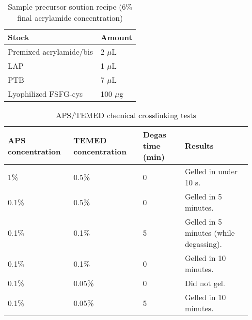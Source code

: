 \begin{table}[b!]
\centering
  \caption[Acrylamide hydrogel recipes.]{Sample precursor soution recipe (6\% final acrylamide concentration)}
    \label{table:acrylamide-recipe}
    \begin{tabular}{p{5cm}p{5cm}}
      Stock & Amount \\
\hline
Premixed acrylamide/bis & 2 $\mu$L \\

LAP & 1 $\mu$L \\

PTB & 7 $\mu$L \\

Lyophilized FSFG-cys & 100 $\mu$g \\
\hline
    \end{tabular}
\end{table}

\begin{table}[b!]
\centering
  \caption[APS/TEMED crosslinking times.]{APS/TEMED chemical crosslinking tests}
    \label{table:APS}
    \begin{tabular}{p{3.5cm}p{4cm}p{2cm}p{5cm}}
      APS concentration & TEMED concentration & Degas time (min) & Results \\
\hline
      1\% & 0.5\% & 0 & Gelled in under 10 s. \\
     0.1\% & 0.5\% & 0 & Gelled in 5 minutes. \\
     0.1\% & 0.1\% & 5 & Gelled in 5 minutes (while degassing). \\
     0.1\% & 0.1\% & 0 & Gelled in 10 minutes. \\
     0.1\% & 0.05\% & 0 & Did not gel. \\
     0.1\% & 0.05\% & 5 & Gelled in 10 minutes. \\
\hline

\hline
    \end{tabular}
\end{table}